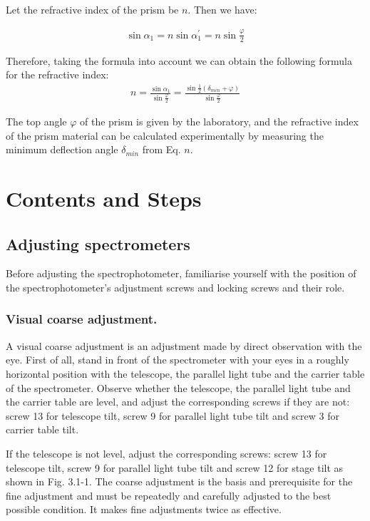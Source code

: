 \documentclass[UTF8]{article}
\begin{document}
    Let the refractive index of the prism be $n$. Then we have:
    
    \begin{eqnarray}
    \sin \alpha _1 = n\sin \alpha ^{'}_1 = n\sin \frac{\varphi }{2}  
    \end{eqnarray}
    
    Therefore, taking the formula into account we can obtain the following formula for the refractive index:
    \begin{eqnarray}
    n = \frac{\sin \alpha _1}{\sin \frac{\varphi }{2} } = \frac{\sin \frac{1}{2}\left ( \delta _{min} +\varphi \right )  }{\sin \frac{\varphi }{2} } 
    \end{eqnarray}
    
    The top angle $\varphi$ of the prism is given by the laboratory, and the refractive index of the prism material can be calculated experimentally by measuring the minimum deflection angle $\delta _{min}$ from Eq. $n$.
    
	\section{Contents and Steps}
	\subsection{Adjusting spectrometers}
     Before adjusting the spectrophotometer, familiarise yourself with the position of the spectrophotometer's adjustment screws and locking screws and their role.
    \subsubsection{Visual coarse adjustment.} 
    A visual coarse adjustment is an adjustment made by direct observation with the eye. First of all, stand in front of the spectrometer with your eyes in a roughly horizontal position with the telescope, the parallel light tube and the carrier table of the spectrometer. Observe whether the telescope, the parallel light tube and the carrier table are level, and adjust the corresponding screws if they are not: screw 13 for telescope tilt, screw 9 for parallel light tube tilt and screw 3 for carrier table tilt.
    
    If the telescope is not level, adjust the corresponding screws: screw 13 for telescope tilt, screw 9 for parallel light tube tilt and screw 12 for stage tilt as shown in Fig. 3.1-1. The coarse adjustment is the basis and prerequisite for the fine adjustment and must be repeatedly and carefully adjusted to the best possible condition. It makes fine adjustments twice as effective.
    
\end{document}

